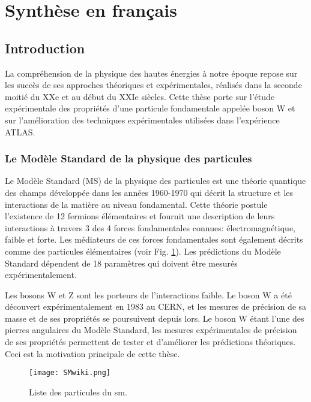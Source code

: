\chapter*{Synthèse en français}

\section*{Introduction}
La compréhension de la physique des hautes énergies à notre époque repose sur les succès de ses approches théoriques et expérimentales, réalisés dans la seconde moitié du XXe et au début du XXIe siècles. Cette thèse porte sur l'étude expérimentale des propriétés d'une particule fondamentale appelée boson W et sur l'amélioration des techniques expérimentales utilisées dans l'expérience ATLAS. 
\subsection*{Le Modèle Standard de la physique des particules}
Le Modèle Standard (MS) de la physique des particules est une théorie quantique des champs développée dans les années 1960-1970 qui décrit la structure et les interactions de la matière au niveau fondamental. Cette théorie postule l'existence de 12 fermions élémentaires et fournit une description de leurs interactions à travers 3 des 4 forces fondamentales connues: électromagnétique, faible et forte. Les médiateurs de ces forces fondamentales sont également décrits comme des particules élémentaires (voir Fig. \ref{fig::SMwiki_synthese}). Les prédictions du Modèle Standard dépendent de 18 paramètres qui doivent être mesurés expérimentalement.

Les bosons W et Z sont les porteurs de l'interactions faible. Le boson W a été découvert expérimentalement en 1983 au CERN, et les mesures de précision de sa masse et de ses propriétés se poursuivent depuis lors. Le boson W étant l'une des pierres angulaires du Modèle Standard, les mesures expérimentales de précision de ses propriétés permettent de tester et d'améliorer les prédictions théoriques. Ceci est la motivation principale de cette thèse.

\begin{figure}[htpb]
	\centering
	\texttt{[image: SMwiki.png]}
	\caption{Liste des particules du \gls{sm}. }
	\label{fig::SMwiki_synthese}
\end{figure}


